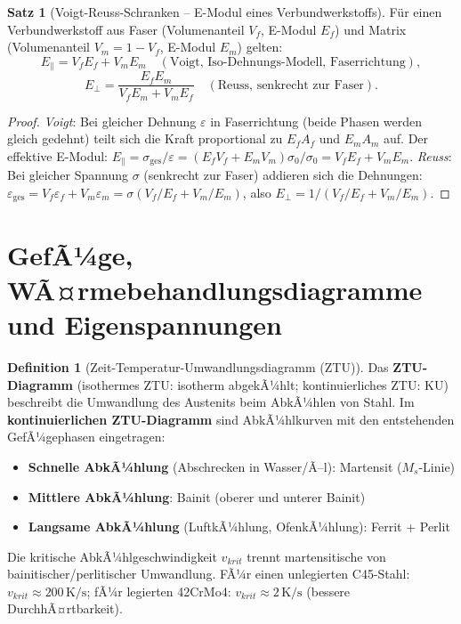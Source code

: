 ﻿\documentclass[a4paper,12pt]{report}
\theoremstyle{definition}
\newtheorem{definition}{Definition}
\newtheorem{satz}{Satz}
\begin{document}
\begin{satz}[Voigt-Reuss-Schranken -- E-Modul eines Verbundwerkstoffs]
F\"ur einen Verbundwerkstoff aus Faser (Volumenanteil $V_f$, E-Modul $E_f$)
und Matrix (Volumenanteil $V_m = 1-V_f$, E-Modul $E_m$) gelten:
\[
  E_{\|} = V_f E_f + V_m E_m \quad (\text{Voigt, Iso-Dehnungs-Modell, Faserrichtung}),
\]
\[
  E_{\perp} = \frac{E_f E_m}{V_f E_m + V_m E_f} \quad (\text{Reuss, senkrecht zur Faser}).
\]
\end{satz}
\begin{proof}
\textit{Voigt}: Bei gleicher Dehnung $\varepsilon$ in Faserrichtung
(beide Phasen werden gleich gedehnt) teilt sich die Kraft proportional
zu $E_f A_f$ und $E_m A_m$ auf. Der effektive E-Modul:
$E_{\|} = \sigma_{\text{ges}}/\varepsilon = (E_f V_f + E_m V_m)\sigma_0/\sigma_0 = V_f E_f + V_m E_m$.
\textit{Reuss}: Bei gleicher Spannung $\sigma$ (senkrecht zur Faser)
addieren sich die Dehnungen: $\varepsilon_{\text{ges}} = V_f\varepsilon_f + V_m\varepsilon_m
= \sigma(V_f/E_f + V_m/E_m)$, also $E_{\perp} = 1/(V_f/E_f + V_m/E_m)$.
\end{proof}


\section{GefÃ¼ge, WÃ¤rmebehandlungsdiagramme und Eigenspannungen}

\begin{definition}[Zeit-Temperatur-Umwandlungsdiagramm (ZTU)]
Das \textbf{ZTU-Diagramm} (isothermes ZTU: isotherm abgekÃ¼hlt; kontinuierliches ZTU: KU)
beschreibt die Umwandlung des Austenits beim AbkÃ¼hlen von Stahl.
Im \textbf{kontinuierlichen ZTU-Diagramm} sind AbkÃ¼hlkurven mit
den entstehenden GefÃ¼gephasen eingetragen:
\begin{itemize}
    \item[-] \textbf{Schnelle AbkÃ¼hlung} (Abschrecken in Wasser/Ã–l): Martensit ($M_s$-Linie)
    \item[-] \textbf{Mittlere AbkÃ¼hlung}: Bainit (oberer und unterer Bainit)
    \item[-] \textbf{Langsame AbkÃ¼hlung} (LuftkÃ¼hlung, OfenkÃ¼hlung): Ferrit + Perlit
\end{itemize}
Die kritische AbkÃ¼hlgeschwindigkeit $v_{krit}$ trennt martensitische
von bainitischer/perlitischer Umwandlung. FÃ¼r einen unlegierten C45-Stahl:
$v_{krit} \approx 200\,\mathrm{K/s}$; fÃ¼r legierten 42CrMo4:
$v_{krit} \approx 2\,\mathrm{K/s}$ (bessere DurchhÃ¤rtbarkeit).
\end{definition}
\end{document}
